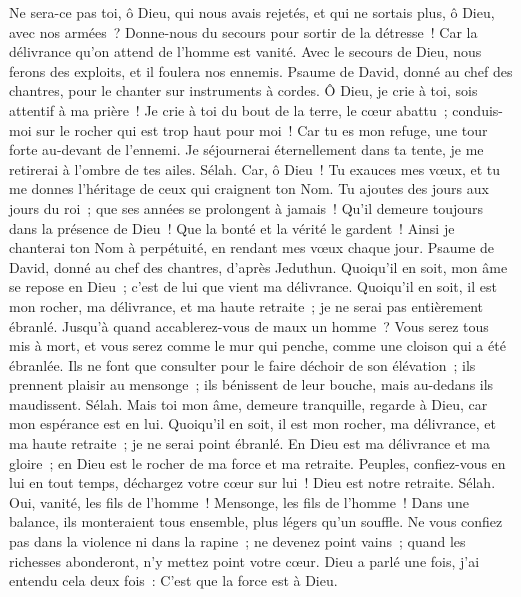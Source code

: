\begin{multicols}{2}
Ne sera-ce pas toi, ô Dieu, qui nous avais rejetés, et qui ne sortais plus, ô Dieu, avec nos armées~?
Donne-nous du secours pour sortir de la détresse~! Car la délivrance qu'on attend de l'homme est vanité.
Avec le secours de Dieu, nous ferons des exploits, et il foulera nos ennemis.
\VerseOne{}Psaume de David, donné au chef des chantres, pour le chanter sur instruments à cordes.
Ô Dieu, je crie à toi, sois attentif à ma prière~!
Je crie à toi du bout de la terre, le cœur abattu~; conduis-moi sur le rocher qui est trop haut pour moi~!
Car tu es mon refuge, une tour forte au-devant de l'ennemi.
Je séjournerai éternellement dans ta tente, je me retirerai à l'ombre de tes ailes. Sélah.
Car, ô Dieu~! Tu exauces mes vœux, et tu me donnes l'héritage de ceux qui craignent ton Nom.
Tu ajoutes des jours aux jours du roi~; que ses années se prolongent à jamais~!
Qu'il demeure toujours dans la présence de Dieu~! Que la bonté et la vérité le gardent~!
Ainsi je chanterai ton Nom à perpétuité, en rendant mes vœux chaque jour.
\VerseOne{}Psaume de David, donné au chef des chantres, d'après Jeduthun.
Quoiqu'il en soit, mon âme se repose en Dieu~; c'est de lui que vient ma délivrance.
Quoiqu'il en soit, il est mon rocher, ma délivrance, et ma haute retraite~; je ne serai pas entièrement ébranlé.
Jusqu'à quand accablerez-vous de maux un homme~? Vous serez tous mis à mort, et vous serez comme le mur qui penche, comme une cloison qui a été ébranlée.
Ils ne font que consulter pour le faire déchoir de son élévation~; ils prennent plaisir au mensonge~; ils bénissent de leur bouche, mais au-dedans ils maudissent. Sélah.
Mais toi mon âme, demeure tranquille, regarde à Dieu, car mon espérance est en lui.
Quoiqu'il en soit, il est mon rocher, ma délivrance, et ma haute retraite~; je ne serai point ébranlé.
En Dieu est ma délivrance et ma gloire~; en Dieu est le rocher de ma force et ma retraite.
Peuples, confiez-vous en lui en tout temps, déchargez votre cœur sur lui~! Dieu est notre retraite. Sélah.
Oui, vanité, les fils de l'homme~! Mensonge, les fils de l'homme~! Dans une balance, ils monteraient tous ensemble, plus légers qu'un souffle.
Ne vous confiez pas dans la violence ni dans la rapine~; ne devenez point vains~; quand les richesses abonderont, n'y mettez point votre cœur.
Dieu a parlé une fois, j'ai entendu cela deux fois~: C'est que la force est à Dieu.

\end{multicols}
